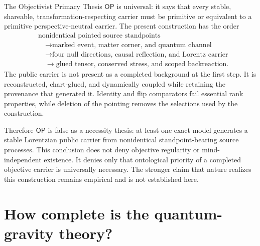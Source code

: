 \documentclass[11pt]{article}
\theoremstyle{definition}
\theoremstyle{remark}
\newcommand{\OPT}{\mathsf{OP}}
\begin{document}
The Objectivist Primacy Thesis $\OPT$ is universal: it says that every stable, shareable, transformation-respecting carrier must be primitive or equivalent to a primitive perspective-neutral carrier. The present construction has the order
\begin{equation}
 \begin{aligned}
 &\text{nonidentical pointed source standpoints}\\
 &\quad\longrightarrow\text{marked event, matter corner, and quantum channel}\\
 &\quad\longrightarrow\text{four null directions, causal reflection, and Lorentz carrier}\\
 &\quad\longrightarrow\text{glued tensor, conserved stress, and scoped backreaction}.
 \end{aligned}
\end{equation}
The public carrier is not present as a completed background at the first step. It is reconstructed, chart-glued, and dynamically coupled while retaining the provenance that generated it. Identity and flip comparators fail essential rank properties, while deletion of the pointing removes the selections used by the construction.

Therefore $\OPT$ is false as a necessity thesis: at least one exact model generates a stable Lorentzian public carrier from nonidentical standpoint-bearing source processes. This conclusion does not deny objective regularity or mind-independent existence. It denies only that ontological priority of a completed objective carrier is universally necessary. The stronger claim that nature realizes this construction remains empirical and is not established here.

\section{How complete is the quantum-gravity theory?}
\end{document}
